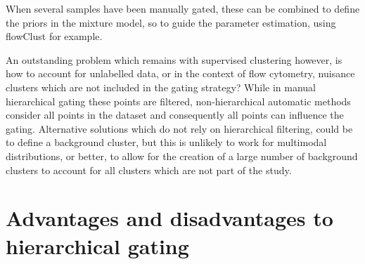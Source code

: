 When several samples have been manually gated, these can be combined to define the priors in the mixture model, so to guide the parameter estimation, using flowClust for example.

An outstanding problem which remains with supervised clustering however, is how to account for unlabelled data, or in the context of flow cytometry, nuisance clusters which are not included in the gating strategy?
While in manual hierarchical gating these points are filtered, non-hierarchical automatic methods consider all points in the dataset and consequently all points can influence the gating.
Alternative solutions which do not rely on hierarchical filtering, could be to define a background cluster, but this is unlikely to work for multimodal distributions, or better, to allow for the creation of a large number of background clusters to account for all clusters which are not part of the study.



\section{Advantages and disadvantages to hierarchical gating}

